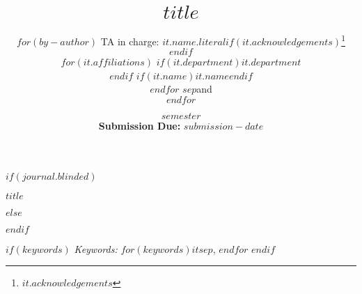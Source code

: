 

\def\spacingset#1{\renewcommand{\baselinestretch}%
{#1}\small\normalsize} \spacingset{1}



\date{
  $semester$\\[1em]
  \textbf{Submission Due:} $submission-date$
}
$if(journal.blinded)$
\spacingset{.8}
\bigskip
\bigskip
\bigskip
\begin{center}
  {\LARGE\bf $title$}
\end{center}
\smallskip
\bigskip
\spacingset{1}
$else$
\title{\bf $title$}
\author{
$for(by-author)$
TA in charge: $it.name.literal$$if(it.acknowledgements)$\thanks{$it.acknowledgements$}$endif$\\
$for(it.affiliations)$
$if(it.department)$$it.department$\\$endif$
$if(it.name)$$it.name$$endif$\\
$endfor$
$sep$and\\
$endfor$
}
\maketitle
$endif$

$if(keywords)$
\noindent%
{\it Keywords:} $for(keywords)$$it$$sep$, $endfor$
\vfill
$endif$

\spacingset{1.9} %

